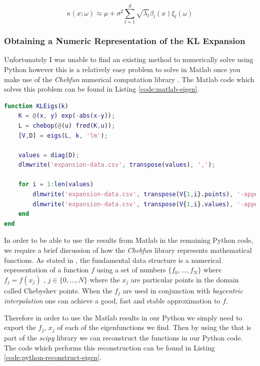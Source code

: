 \begin{equation}\label{eq:oned-stochastic-kl-kappa}
    \kappa(x;\omega) \approx
        \mu + \sigma^2\sum_{l=1}^d\sqrt{\lambda_l}\beta_l(x)\xi_l(\omega)
\end{equation}

\subsubsection{Obtaining a Numeric Representation of the KL Expansion}

Unfortunately I was unable to find an existing method to numerically solve
 using Python however this is
a relatively easy problem to solve in Matlab once you make use of the
\textit{Chebfun} numerical computation library \cite{chebfun}. The Matlab code
which solves this problem can be found in Listing \ref{code:matlab-eigen}.

\begin{lstlisting}[caption={Matlab code which finds the first 5 eigenvalues and
                            associated eigenfunctions},
                   label={code:matlab-eigen},
                   language=Matlab]
function KLEigs(k)
    K = @(x, y) exp(-abs(x-y));
    L = chebop(@(u) fred(K,u));
    [V,D] = eigs(L, k, 'lm');

    values = diag(D);
    dlmwrite('expansion-data.csv', transpose(values), ',');

    for i = 1:len(values)
        dlmwrite('expansion-data.csv', transpose(V{1,i}.points), '-append', 'delimiter', ',');
        dlmwrite('expansion-data.csv', transpose(V{1,i}.values), '-append', 'delimiter', ',');
    end
end
\end{lstlisting}

In order to be able to use the results from Matlab in the remaining Python
code, we require a brief discussion of how the \textit{Chebfun} library
represents mathematical functions. As stated in \cite{chebfun-data}, the
fundamental data structure  is a numerical representation of a
function $f$ using a set of numbers $\{f_0, \ldots, f_N\}$ where $f_j = f(x_j)$
, $j \in \{0, \ldots, N\}$ where the $x_j$ are particular points in the domain
called Chebyshev points. When the $f_j$ are used in conjunction with
\textit{baycentric interpolation} one can achieve a good, fast and stable
approximation to $f$.

Therefore in order to use the Matlab results in our Python we simply need to
export the $f_j$, $x_j$ of each of the eigenfunctions we find. Then by using
the  that is part of the \textit{scipy} library
\cite{scipy} we can reconstruct the functions in our Python code. The code
which performs this reconstruction can be found in Listing
\ref{code:python-reconstruct-eigen}.

